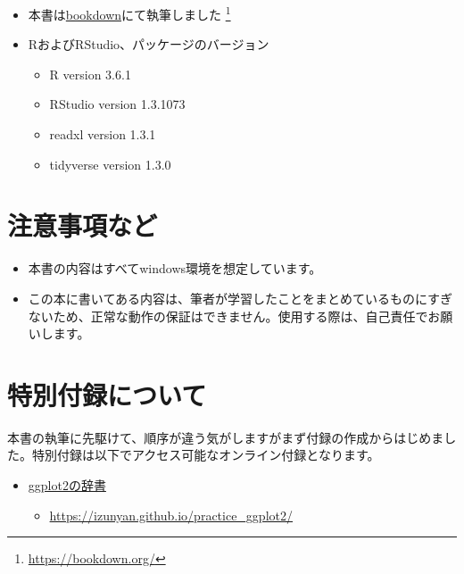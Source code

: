 \documentclass[
  xelatex,ja=standard, b5paper]{bxjsbook}
\providecommand{\tightlist}{%
  \setlength{\itemsep}{0pt}\setlength{\parskip}{0pt}}
\begin{document}
\begin{itemize}
\item
  本書は\href{https://bookdown.org/}{bookdown}にて執筆しました \footnote{\url{https://bookdown.org/}}
\item
  RおよびRStudio、パッケージのバージョン

  \begin{itemize}
  \tightlist
  \item
    R version 3.6.1
  \item
    RStudio version 1.3.1073
  \item
    readxl version 1.3.1
  \item
    tidyverse version 1.3.0
  \end{itemize}
\end{itemize}

\hypertarget{ux6ce8ux610fux4e8bux9805ux306aux3069}{%
\section*{注意事項など}\label{ux6ce8ux610fux4e8bux9805ux306aux3069}}

\begin{itemize}
\item
  本書の内容はすべてwindows環境を想定しています。
\item
  この本に書いてある内容は、筆者が学習したことをまとめているものにすぎないため、正常な動作の保証はできません。使用する際は、自己責任でお願いします。
\end{itemize}

\hypertarget{huroku}{%
\section*{特別付録について}\label{huroku}}

本書の執筆に先駆けて、順序が違う気がしますがまず付録の作成からはじめました。特別付録は以下でアクセス可能なオンライン付録となります。

\begin{itemize}
\tightlist
\item
  \href{https://izunyan.github.io/practice_ggplot2/}{ggplot2の辞書}

  \begin{itemize}
  \tightlist
  \item
    \url{https://izunyan.github.io/practice_ggplot2/}
  \end{itemize}
\end{itemize}
\end{document}
